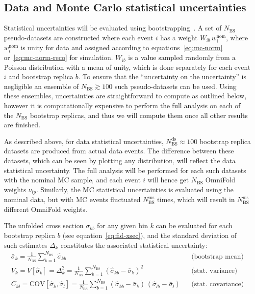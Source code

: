 \subsection{Data and Monte Carlo statistical uncertainties}
Statistical uncertainties will be evaluated using bootstrapping~\cite{ATLAS-bootstrap}.  A set of $N_\mathrm{BS}$ pseudo-datasets are constructed where each event $i$ has a weight $W_{ib}\,w^\text{nom}_i$, where $w^\text{nom}_{i}$ is unity for data and assigned according to equations~\ref{eq:mc-norm} or~\ref{eq:mc-norm-reco} for simulation. $W_{ib}$ is a value sampled randomly from a Poisson distribution with a mean of unity, which is done separately for each event $i$ and bootstrap replica $b$.  To ensure that the ``uncertainty on the uncertainty'' is negligible an ensemble of $N_\mathrm{BS} \gtrsim 100$ such pseudo-datasets can be used.
Using these ensembles, uncertainties are straightforward to compute as outlined below, however it is computationally expensive to perform the full analysis on each of the $N_\mathrm{BS}$ bootstrap replicas, and thus we will compute them once all other results are finished.

As described above, for data statistical uncertainties, $N_\mathrm{BS}^\mathrm{ds} \approx 100$ bootstrap replica datasets are produced from actual data events.
The difference between these datasets, which can be seen by plotting any distribution, will reflect the data statistical uncertainty.
The full analysis will be performed for each such datasets with the nominal MC sample, and each event $i$ will hence get $N_\mathrm{BS}$ OmniFold weights $\nu_{ip}$.
Similarly, the MC statistical uncertainties is evaluated using the nominal data, but with MC events fluctuated $N_\mathrm{BS}^\mathrm{ms}$ times, which will result in $N_\mathrm{BS}^\mathrm{ms}$ different OmniFold weights.

The unfolded cross section $\sigma_{kb}$ for any given bin $k$ can be evaluated for each bootstrap replica $b$ (see equation~\ref{eq:fid-xsec}), and the standard  deviation of such estimates $\Delta_{k}$ constitutes the associated statistical uncertainty:
\begin{eqnarray}
  \label{eq:bs}
  \bar{\sigma}_k = \frac{1}{N_\mathrm{BS}}\sum_{b=1}^{N_\mathrm{BS}} \hat{\sigma}_{kb}
  & & \text{(bootstrap mean)}\\
  V_k = V[\hat{\sigma}_k] = \Delta_k^2 = \frac{1}{N_\mathrm{BS}}\sum_{b=1}^{N_\mathrm{BS}} \left(\hat{\sigma}_{kb} - \bar{\sigma}_k\right)^2
  & & \text{(stat. variance)}\\
  C_{kl} = \mathrm{COV}[\hat{\sigma}_k,\hat{\sigma}_l] = \frac{1}{N_\mathrm{BS}}\sum_{b=1}^{N_\mathrm{BS}} \left(\hat{\sigma}_{kb} - \bar{\sigma}_k\right)\,\left(\hat{\sigma}_{lb} - \bar{\sigma}_l\right)
  & & \text{(stat. covariance)}
\end{eqnarray}

